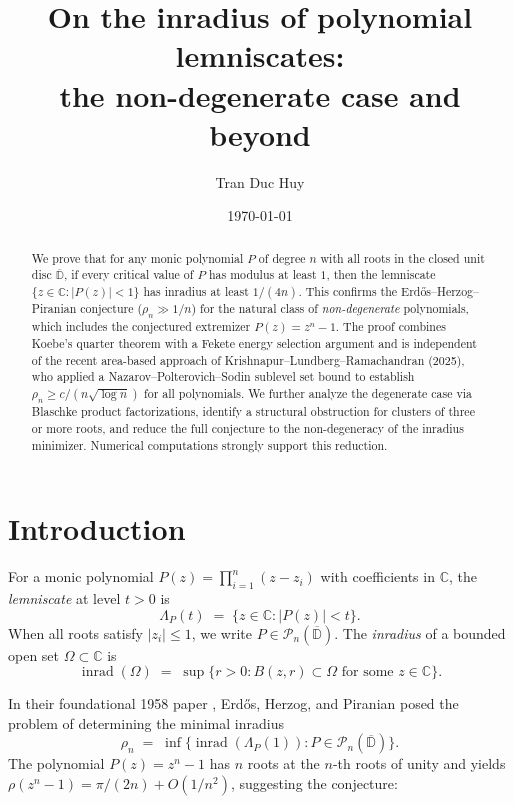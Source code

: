 \documentclass[11pt,a4paper]{amsart}
\title[Inradius of polynomial lemniscates]{On the inradius of polynomial lemniscates: \\
the non-degenerate case and beyond}
\author{Tran Duc Huy}
\date{\today}
\theoremstyle{definition}
\newcommand{\D}{\mathbb{D}}
\newcommand{\C}{\mathbb{C}}
\newcommand{\Pn}{\mathcal{P}_n}
\newcommand{\abs}[1]{\lvert #1 \rvert}
\newcommand{\inrad}{\operatorname{inrad}}
\begin{document}
\begin{abstract}
We prove that for any monic polynomial $P$ of degree $n$ with all roots in
the closed unit disc $\overline{\D}$, if every critical value of $P$ has
modulus at least $1$, then the lemniscate $\{z \in \C : \abs{P(z)} < 1\}$
has inradius at least $1/(4n)$.  This confirms the Erd\H{o}s--Herzog--Piranian
conjecture ($\rho_n \gg 1/n$) for the natural class of \emph{non-degenerate}
polynomials, which includes the conjectured extremizer $P(z) = z^n - 1$.
The proof combines Koebe's quarter theorem with a Fekete energy
selection argument and is independent of the recent area-based approach of
Krishnapur--Lundberg--Ramachandran (2025), who applied
a Nazarov--Polterovich--Sodin sublevel set bound to establish
$\rho_n \geq c/(n\sqrt{\log n})$ for all polynomials.
We further analyze the degenerate case via Blaschke product
factorizations, identify a structural obstruction for clusters of
three or more roots, and reduce the full conjecture to the
non-degeneracy of the inradius minimizer.
Numerical computations strongly support this reduction.
\end{abstract}

\maketitle

\section{Introduction}

For a monic polynomial $P(z) = \prod_{i=1}^n (z - z_i)$ with coefficients in $\C$,
the \emph{lemniscate} at level $t > 0$ is
\[
  \Lambda_P(t) \;=\; \bigl\{z \in \C : \abs{P(z)} < t\bigr\}.
\]
When all roots satisfy $\abs{z_i} \leq 1$, we write
$P \in \Pn(\overline{\D})$.
The \emph{inradius} of a bounded open set $\Omega \subset \C$ is
\[
  \inrad(\Omega) \;=\; \sup\bigl\{r > 0 : B(z,r) \subset \Omega
  \text{ for some } z \in \C\bigr\}.
\]

In their foundational 1958 paper \cite{EHP58}, Erd\H{o}s, Herzog, and Piranian
posed the problem of determining the minimal inradius
\[
  \rho_n \;=\; \inf\bigl\{\inrad(\Lambda_P(1)) : P \in \Pn(\overline{\D})\bigr\}.
\]
The polynomial $P(z) = z^n - 1$ has $n$ roots at the $n$-th roots of unity
and yields $\rho(z^n - 1) = \pi/(2n) + O(1/n^2)$, suggesting the conjecture:
\end{document}
